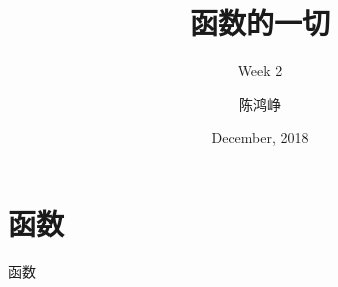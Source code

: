 \documentclass{myslide}
\title{函数的一切}
\subtitle{Week 2}
\author[chhzh123]{陈鸿峥}
\institute[]{\small\url{https://github.com/chhzh123/Notes-of-Math/blob/master/Mathematical_analysis/main.pdf}}
\date[Dec, 2018]{December, 2018}
\begin{document}
\begin{frame}
\titlepage
\end{frame}

\begin{frame}
\tableofcontents[subsectionstyle=show]
\end{frame}

\section{函数}
\begin{frame}
\sectionpage
\end{frame}

\begin{frame}{函数}

\end{frame}
\end{document}
